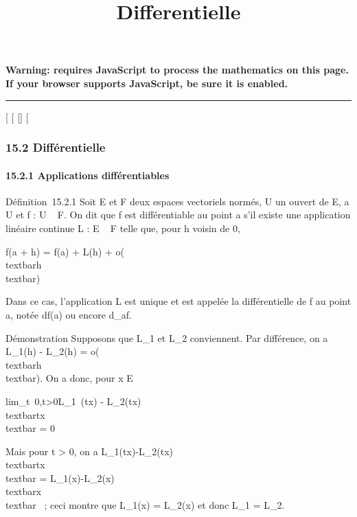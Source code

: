 \documentclass[]{article}
\title{Differentielle}
\author{}
\date{}
\begin{document}
\maketitle

\textbf{Warning: 
requires JavaScript to process the mathematics on this page.\\ If your
browser supports JavaScript, be sure it is enabled.}

\begin{center}\rule{3in}{0.4pt}\end{center}

{[}
{[}
{[}{]}
{[}

\subsubsection{15.2 Différentielle}

\paragraph{15.2.1 Applications différentiables}

Définition~15.2.1 Soit E et F deux espaces vectoriels normés, U un
ouvert de E, a \in U et f : U \rightarrow~ F. On dit que f est différentiable au
point a s'il existe une application linéaire continue L : E \rightarrow~ F telle
que, pour h voisin de 0,

f(a + h) = f(a) + L(h) +
o(\\textbar{}h\\textbar{})

Dans ce cas, l'application L est unique et est appelée la différentielle
de f au point a, notée df(a) ou encore d\_af.

Démonstration Supposons que L\_1 et L\_2 conviennent.
Par différence, on a L\_1(h) - L\_2(h) =
o(\\textbar{}h\\textbar{}). On a donc,
pour x \in E \diagdown\0\

lim\_t\rightarrow~0,t\textgreater{}0L\_1~(tx)
- L\_2(tx)\over
\\textbar{}tx\\textbar{} = 0

Mais pour t \textgreater{} 0, on a
L\_1(tx)-L\_2(tx)\over
\\textbar{}tx\\textbar{} =
L\_1(x)-L\_2(x)\over
\\textbar{}x\\textbar{} ~; ceci montre
que L\_1(x) = L\_2(x) et donc L\_1 =
L\_2.
\end{document}
